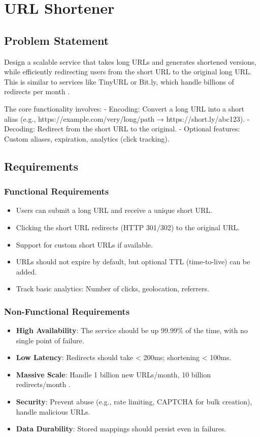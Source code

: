 \chapter{URL Shortener}

\section{Problem Statement}
Design a scalable service that takes long URLs and generates shortened versions, while efficiently redirecting users from the short URL to the original long URL. This is similar to services like TinyURL or Bit.ly, which handle billions of redirects per month \cite{bytebytego2023}.

The core functionality involves:
- Encoding: Convert a long URL into a short alias (e.g., https://example.com/very/long/path → https://short.ly/abc123).
- Decoding: Redirect from the short URL to the original.
- Optional features: Custom aliases, expiration, analytics (click tracking).

\section{Requirements}

\subsection{Functional Requirements}
\begin{itemize}
  \item Users can submit a long URL and receive a unique short URL.
  \item Clicking the short URL redirects (HTTP 301/302) to the original URL.
  \item Support for custom short URLs if available.
  \item URLs should not expire by default, but optional TTL (time-to-live) can be added.
  \item Track basic analytics: Number of clicks, geolocation, referrers.
\end{itemize}

\subsection{Non-Functional Requirements}
\begin{itemize}
  \item \textbf{High Availability}: The service should be up 99.99\% of the time, with no single point of failure.
  \item \textbf{Low Latency}: Redirects should take < 200ms; shortening < 100ms.
  \item \textbf{Massive Scale}: Handle 1 billion new URLs/month, 10 billion redirects/month \cite{hellointerview2024}.
  \item \textbf{Security}: Prevent abuse (e.g., rate limiting, CAPTCHA for bulk creation), handle malicious URLs.
  \item \textbf{Data Durability}: Stored mappings should persist even in failures.
\end{itemize}

